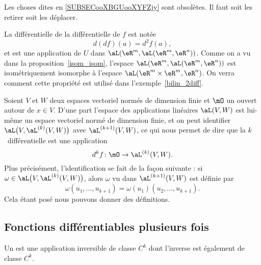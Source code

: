 \begin{probleme}        \label{PROBooDLAWooLqHDPs}
    Les choses dites en \ref{SUBSECooXBGUooXYFZjy} sont obsolètes. Il faut soit les retirer soit les déplacer.
\end{probleme}

La différentielle de la différentielle de $f$ est notée
\[
d(df)(a)=d^2f(a),
\]
et est une application de $U$ dans $\aL(\eR^m,\aL(\eR^m, \eR^n) )$. Comme on a vu dans la proposition~\ref{isom_isom}, l'espace $\aL(\eR^m,\aL(\eR^m, \eR^n) )$ est isométriquement isomorphe à l'espace $\aL(\eR^m\times\eR^m, \eR^n )$. On verra comment cette propriété  est utilisé dans l'exemple~\ref{bilin_2diff}.


Soient \( V\) et \( W\) deux espaces vectoriel normés de dimension finie et \( \mO\) un ouvert autour de \( x\in V\). D'une part l'espace des applications linéaires \( \aL(V,W)\) est lui-même un espace vectoriel normé de dimension finie, et on peut identifier \(  \aL\big( V,\aL^{(k)}(V,W) \big)\) avec \( \aL^{(k+1)}(V,W)\), ce qui nous permet de dire que la \( k\)\ieme\ différentielle est une application
\begin{equation}
    d^kf\colon \mO\to \aL^{(k)}(V,W).
\end{equation}
Plus précisément, l'identification se fait de la façon suivante : si \( \omega\in \aL\big( V,\aL^{(k)}(V,W) \big)\), alors \( \omega\) vu dans \( \aL^{(k+1)}(V,W)\) est définie par
\begin{equation}
    \omega(u_1,\ldots, u_{k+1})=\omega(u_1)(u_2,\ldots, u_{k+1}).
\end{equation}
Cela étant posé nous pouvons donner des définitions.

\subsection{Fonctions différentiables plusieurs fois}

\begin{definition}
    Un  est une application inversible de classe \( C^k\) dont l'inverse est également de classe \( C^k\).
\end{definition}

